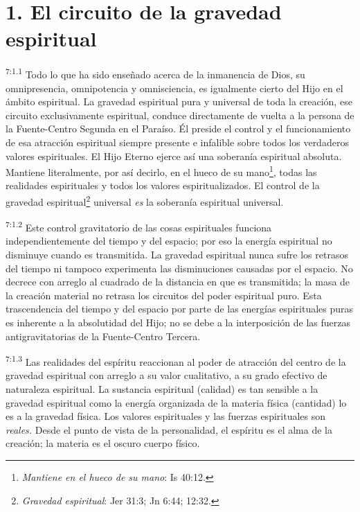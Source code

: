 \section*{1. El circuito de la gravedad espiritual}
\par
\textsuperscript{7:1.1} Todo lo que ha sido enseñado acerca de la inmanencia de Dios, su omnipresencia, omnipotencia y omnisciencia, es igualmente cierto del Hijo en el ámbito espiritual. La gravedad espiritual pura y universal de toda la creación, ese circuito exclusivamente espiritual, conduce directamente de vuelta a la persona de la Fuente-Centro Segunda en el Paraíso. Él preside el control y el funcionamiento de esa atracción espiritual siempre presente e infalible sobre todos los verdaderos valores espirituales. El Hijo Eterno ejerce así una soberanía espiritual absoluta. Mantiene literalmente, por así decirlo, en el hueco de su mano\footnote{\textit{Mantiene en el hueco de su mano}: Is 40:12.}, todas las realidades espirituales y todos los valores espiritualizados. El control de la gravedad espiritual\footnote{\textit{Gravedad espiritual}: Jer 31:3; Jn 6:44; 12:32.} universal \textit{es} la soberanía espiritual universal.

\par
\textsuperscript{7:1.2} Este control gravitatorio de las cosas espirituales funciona independientemente del tiempo y del espacio; por eso la energía espiritual no disminuye cuando es transmitida. La gravedad espiritual nunca sufre los retrasos del tiempo ni tampoco experimenta las disminuciones causadas por el espacio. No decrece con arreglo al cuadrado de la distancia en que es transmitida; la masa de la creación material no retrasa los circuitos del poder espiritual puro. Esta trascendencia del tiempo y del espacio por parte de las energías espirituales puras es inherente a la absolutidad del Hijo; no se debe a la interposición de las fuerzas antigravitatorias de la Fuente-Centro Tercera.

\par
\textsuperscript{7:1.3} Las realidades del espíritu reaccionan al poder de atracción del centro de la gravedad espiritual con arreglo a su valor cualitativo, a su grado efectivo de naturaleza espiritual. La sustancia espiritual (calidad) es tan sensible a la gravedad espiritual como la energía organizada de la materia física (cantidad) lo es a la gravedad física. Los valores espirituales y las fuerzas espirituales son \textit{reales.} Desde el punto de vista de la personalidad, el espíritu es el alma de la creación; la materia es el oscuro cuerpo físico.

